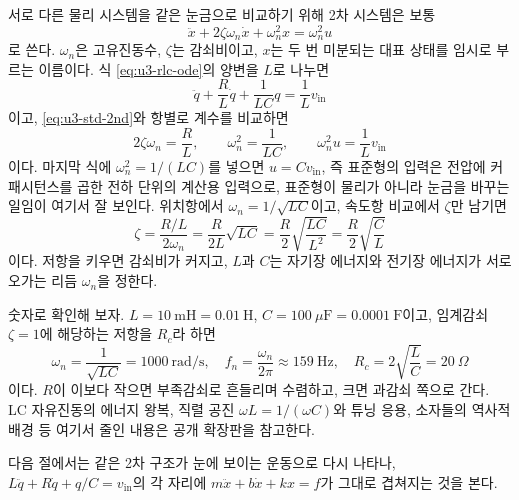 서로 다른 물리 시스템을 같은 눈금으로 비교하기 위해 2차 시스템은 보통
\begin{equation}
  \ddot{x} + 2\zeta\omega_n\dot{x} + \omega_n^2 x = \omega_n^2 u
  \label{eq:u3-std-2nd}
\end{equation}
로 쓴다.
$\omega_n$은 고유진동수, $\zeta$는 감쇠비이고, $x$는 두 번 미분되는 대표
상태를 임시로 부르는 이름이다.
식 \eqref{eq:u3-rlc-ode}의 양변을 $L$로 나누면
\begin{equation}
  \ddot{q} + \frac{R}{L}\dot{q} + \frac{1}{LC}q = \frac{1}{L}v_{\mathrm{in}}
\end{equation}
이고, \eqref{eq:u3-std-2nd}와 항별로 계수를 비교하면
\begin{equation}
  2\zeta\omega_n = \frac{R}{L},
  \qquad
  \omega_n^2 = \frac{1}{LC},
  \qquad
  \omega_n^2 u = \frac{1}{L}v_{\mathrm{in}}
\end{equation}
이다.
마지막 식에 $\omega_n^2 = 1/(LC)$를 넣으면 $u = C v_{\mathrm{in}}$,
즉 표준형의 입력은 전압에 커패시턴스를 곱한 전하 단위의 계산용 입력으로,
표준형이 물리가 아니라 눈금을 바꾸는 일임이 여기서 잘 보인다.
위치항에서 $\omega_n = 1/\sqrt{LC}$이고, 속도항 비교에서 $\zeta$만 남기면
\begin{equation}
  \zeta
  = \frac{R/L}{2\omega_n}
  = \frac{R}{2L}\sqrt{LC}
  = \frac{R}{2}\sqrt{\frac{LC}{L^2}}
  = \frac{R}{2}\sqrt{\frac{C}{L}}
\end{equation}
이다.
저항을 키우면 감쇠비가 커지고, $L$과 $C$는 자기장 에너지와 전기장
에너지가 서로 오가는 리듬 $\omega_n$을 정한다.

숫자로 확인해 보자.
$L = 10~\mathrm{mH} = 0.01~\mathrm{H}$,
$C = 100~\mu\mathrm{F} = 0.0001~\mathrm{F}$이고, 임계감쇠 $\zeta = 1$에
해당하는 저항을 $R_c$라 하면
\begin{equation}
  \omega_n = \frac{1}{\sqrt{LC}} = 1000~\mathrm{rad/s},
  \quad
  f_n = \frac{\omega_n}{2\pi} \approx 159~\mathrm{Hz},
  \quad
  R_c = 2\sqrt{\frac{L}{C}} = 20~\Omega
\end{equation}
이다.
$R$이 이보다 작으면 부족감쇠로 흔들리며 수렴하고, 크면 과감쇠 쪽으로 간다.
LC 자유진동의 에너지 왕복, 직렬 공진 $\omega L = 1/(\omega C)$와 튜닝
응용, 소자들의 역사적 배경 등 여기서 줄인 내용은 공개 확장판을 참고한다.

다음 절에서는 같은 2차 구조가 눈에 보이는 운동으로 다시 나타나,
$L\ddot{q} + R\dot{q} + q/C = v_{\mathrm{in}}$의 각 자리에
$m\ddot{x} + b\dot{x} + kx = f$가 그대로 겹쳐지는 것을 본다.
